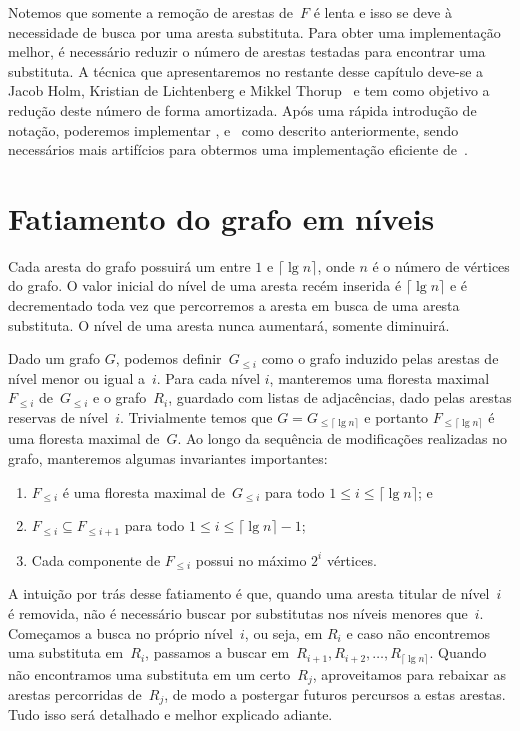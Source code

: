 Notemos que somente a remoção de arestas de~$F$ é lenta e isso se deve à necessidade de busca por uma aresta substituta. Para obter uma implementação melhor, é necessário reduzir o número de arestas testadas para encontrar uma substituta. A técnica que apresentaremos no restante desse capítulo deve-se a Jacob Holm, Kristian de Lichtenberg e Mikkel Thorup~\cite{poly_log} e tem como objetivo a redução deste número de forma amortizada. Após uma rápida introdução de notação, poderemos implementar \dymGraphCreate{}, \dymGraphAddEdge{} e~\dymGraphQuery{} como descrito anteriormente, sendo necessários mais artifícios para obtermos uma implementação eficiente de~\dymGraphDelEdge{}.


\section{Fatiamento do grafo em níveis}
\label{sec:fatia-em-niveis}
Cada aresta do grafo possuirá um  entre $1$ e $\lceil \lg n \rceil$, onde $n$ é o número de vértices do grafo. O valor inicial do nível de uma aresta recém inserida é $\lceil \lg n \rceil$ e é decrementado toda vez que percorremos a aresta em busca de uma aresta substituta. O nível de uma aresta nunca aumentará, somente diminuirá. 

Dado um grafo $G$, podemos definir~$G_{\leqslant i}$ como o grafo induzido pelas arestas de nível menor ou igual a~$i$. Para cada nível $i$, manteremos uma floresta maximal~$F_{\leqslant i}$ de~$G_{\leqslant i}$ e o grafo~$R_i$, guardado com listas de adjacências, dado pelas arestas reservas de nível~$i$. Trivialmente temos que $G = G_{\leqslant \lceil \lg n \rceil}$ e portanto $F_{\leqslant \lceil \lg n \rceil}$ é uma floresta maximal de~$G$. Ao longo da sequência de modificações realizadas no grafo, manteremos algumas invariantes importantes:
\begin{enumerate}[label=(\roman*)]
    \item $F_{\leqslant i}$ é uma floresta maximal de~$G_{\leqslant i}$ para todo $1\leqslant i \leqslant \lceil \lg n \rceil$; e\label{invar:SF}
    \item $F_{\leqslant i}\subseteq F_{\leqslant i+1}$ para todo $1\leqslant i \leqslant \lceil \lg n \rceil-1$; \label{invar:contida}
    \item Cada componente de $F_{\leqslant i}$ possui no máximo $2^i$ vértices.\label{invar:tamanho}
\end{enumerate}

A intuição por trás desse fatiamento é que, quando uma aresta titular de nível~$i$ é removida, não é necessário buscar por substitutas nos níveis menores que~$i$.
Começamos a busca no próprio nível~$i$, ou seja, em $R_i$ e caso não encontremos uma substituta em~$R_i$, passamos a buscar em~$R_{i+1}, R_{i+2}, \ldots, R_{\lceil \lg n \rceil}$.
Quando não encontramos uma substituta em um certo~$R_j$, aproveitamos para rebaixar as arestas percorridas de~$R_j$, de modo a postergar futuros percursos a estas arestas.
Tudo isso será detalhado e melhor explicado adiante.

